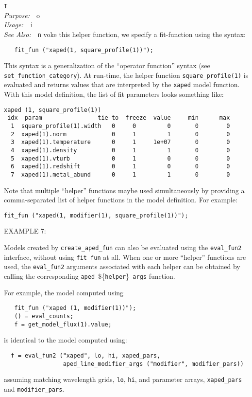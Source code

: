 \documentclass{book}
\makeatletter
\newif\ifpdf
\newenvironment{isisfunction}[4]%
{\index{{#1}@{\tt #1}}%
  \ifpdf
  \else
     \addcontentsline{toc}{subsection}{{#1} -- {#2}}
  \fi
  \vbox{
          \vspace*{\baselineskip}
          {\LARGE\tt #1}\vspace*{\baselineskip}\\
          {{\it Purpose:}~~{#2}}\\
          {{\it Usage:}~~{\tt #3}}\\
          {{\it See Also:}~~{\tt #4}}
       }
}%
{ }
\makeatother
\begin{document}
{\begin{isisfunction}
To invoke this helper function, we specify a fit-function using
the syntax:
\begin{verbatim}
   fit_fun ("xaped(1, square_profile(1))");
\end{verbatim}
This syntax is a generalization of the ``operator function''
syntax (see \verb|set_function_category|).  At run-time, the
helper function \verb|square_profile(1)| is evaluated and returns
values that are interpreted by the \verb|xaped| model function.
With this model definition, the list of fit parameters looks
something like:
\begin{verbatim}
xaped (1, square_profile(1))
 idx  param                tie-to  freeze  value     min      max
  1  square_profile(1).width   0     0         0       0        0
  2  xaped(1).norm             0     1         1       0        0
  3  xaped(1).temperature      0     1     1e+07       0        0
  4  xaped(1).density          0     1         1       0        0
  5  xaped(1).vturb            0     1         0       0        0
  6  xaped(1).redshift         0     1         0       0        0
  7  xaped(1).metal_abund      0     1         1       0        0
\end{verbatim}

Note that multiple ``helper'' functions maybe used
simultaneously by providing a comma-separated list of helper
functions in the model definition.  For example:
\begin{verbatim}
fit_fun ("xaped(1, modifier(1), square_profile(1))");
\end{verbatim}

EXAMPLE 7:

Models created by \verb|create_aped_fun| can also be evaluated
using the \verb|eval_fun2| interface, without using
\verb|fit_fun| at all.  When one or more ``helper'' functions
are used, the \verb|eval_fun2| arguments associated with each
helper can be obtained by calling the corresponding
\verb|aped_|\$\{\verb|helper|\}\verb|_args| function.

For example, the model computed using
\begin{verbatim}
   fit_fun ("xaped (1, modifier(1))");
   () = eval_counts;
   f = get_model_flux(1).value;
\end{verbatim}
is identical to the model computed using:
\begin{verbatim}
  f = eval_fun2 ("xaped", lo, hi, xaped_pars,
                 aped_line_modifier_args ("modifier", modifier_pars))
\end{verbatim}
assuming matching wavelength grids, \verb|lo|, \verb|hi|, and
parameter arrays, \verb|xaped_pars| and \verb|modifier_pars|.


\end{isisfunction}}
\end{document}
